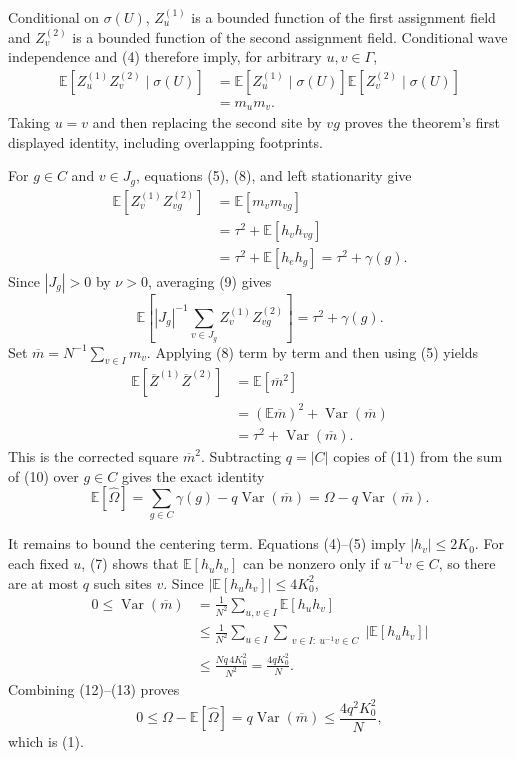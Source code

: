 Conditional on \(\sigma(U)\), \(Z_u^{(1)}\) is a bounded function of the first assignment field and \(Z_v^{(2)}\) is a bounded function of the second assignment field.  Conditional wave independence and (4) therefore imply, for arbitrary \(u,v\in\Gamma\),
\[
 \begin{aligned}
 \mathbb E[Z_u^{(1)}Z_v^{(2)}\mid\sigma(U)]
 &=\mathbb E[Z_u^{(1)}\mid\sigma(U)]
   \mathbb E[Z_v^{(2)}\mid\sigma(U)]\\
 &=m_um_v.
 \end{aligned} \tag{8}
\]
Taking \(u=v\) and then replacing the second site by \(vg\) proves the theorem's first displayed identity, including overlapping footprints.

For \(g\in C\) and \(v\in J_g\), equations (5), (8), and left stationarity give
\[
 \begin{aligned}
 \mathbb E[Z_v^{(1)}Z_{vg}^{(2)}]
 &=\mathbb E[m_vm_{vg}]\\
 &=\tau^2+\mathbb E[h_vh_{vg}]\\
 &=\tau^2+\mathbb E[h_eh_g]
 =\tau^2+\gamma(g).
 \end{aligned} \tag{9}
\]
Since \(|J_g|>0\) by \(\nu>0\), averaging (9) gives
\[
 \mathbb E\!\left[
 |J_g|^{-1}\sum_{v\in J_g}Z_v^{(1)}Z_{vg}^{(2)}
 \right]=\tau^2+\gamma(g). \tag{10}
\]
Set \(\overline m=N^{-1}\sum_{v\in I}m_v\).  Applying (8) term by term and then using (5) yields
\[
 \begin{aligned}
 \mathbb E[\overline Z^{(1)}\overline Z^{(2)}]
 &=\mathbb E[\overline m^2]\\
 &=(\mathbb E\overline m)^2+\operatorname{Var}(\overline m)\\
 &=\tau^2+\operatorname{Var}(\overline m).
 \end{aligned} \tag{11}
\]
This is the corrected square \(\overline m^2\).  Subtracting \(q=|C|\) copies of (11) from the sum of (10) over \(g\in C\) gives the exact identity
\[
 \mathbb E[\widehat\Omega]
 =\sum_{g\in C}\gamma(g)-q\operatorname{Var}(\overline m)
 =\Omega-q\operatorname{Var}(\overline m). \tag{12}
\]

It remains to bound the centering term.  Equations (4)--(5) imply \(|h_v|\le2K_0\).  For each fixed \(u\), (7) shows that \(\mathbb E[h_uh_v]\) can be nonzero only if \(u^{-1}v\in C\), so there are at most \(q\) such sites \(v\).  Since \(|\mathbb E[h_uh_v]|\le4K_0^2\),
\[
 \begin{aligned}
 0\le\operatorname{Var}(\overline m)
 &=\frac1{N^2}\sum_{u,v\in I}\mathbb E[h_uh_v]\\
 &\le\frac1{N^2}\sum_{u\in I}
       \sum_{\substack{v\in I:\ u^{-1}v\in C}}
       |\mathbb E[h_uh_v]|\\
 &\le\frac{Nq\,4K_0^2}{N^2}
 =\frac{4qK_0^2}{N}. 
 \end{aligned} \tag{13}
\]
Combining (12)--(13) proves
\[
 0\le\Omega-\mathbb E[\widehat\Omega]
 =q\operatorname{Var}(\overline m)
 \le\frac{4q^2K_0^2}{N},
\]
which is (1).


